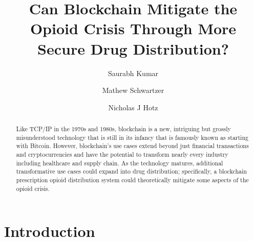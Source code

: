 \documentclass[sigconf]{acmart}
\begin{document}
\title{Can Blockchain Mitigate the Opioid Crisis Through More Secure Drug Distribution?}


\author{Saurabh Kumar}

\author{Mathew Schwartzer}

\author{Nicholas J Hotz}

\begin{abstract}
Like TCP/IP in the 1970s and 1980s, blockchain is a new, intriguing but grossly misunderstood technology that is still in its infancy that is famously known as starting with Bitcoin. However, blockchain's use cases extend beyond just financial transactions and cryptocurrencies and have the potential to transform nearly every industry including healthcare and supply chain. As the technology matures, additional transformative use cases could expand into drug distribution; specifically, a blockchain prescription opioid distribution system could theoretically mitigate some aspects of the opioid crisis.  
\end{abstract}


\maketitle

\section{Introduction}
\end{document}
